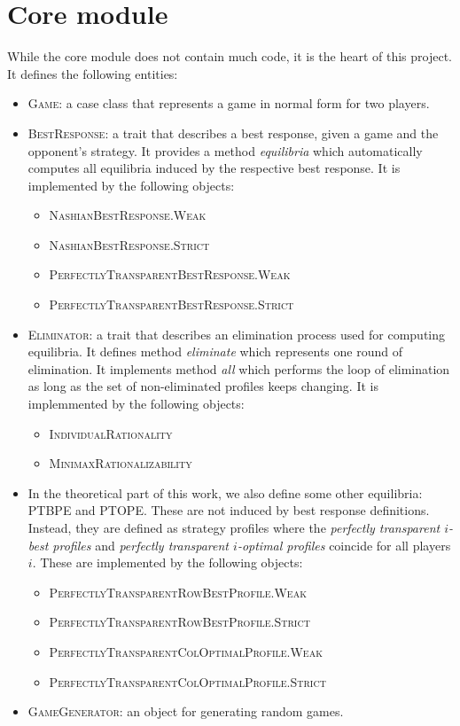 \section{Core module}
While the core module does not contain much code, it is the heart of this project.
It defines the following entities:
\begin{itemize}
	\item \textsc{Game}: a case class that represents a game in normal form for two players.
	\item \textsc{BestResponse}: a trait that describes a best response, given a game and the opponent's strategy.
	It provides a method \textit{equilibria} which automatically computes all equilibria induced by the respective best response.
	It is implemented by the following objects:
	\begin{itemize}
		\item \textsc{NashianBestResponse.Weak}
		\item \textsc{NashianBestResponse.Strict}
		\item \textsc{PerfectlyTransparentBestResponse.Weak}
		\item \textsc{PerfectlyTransparentBestResponse.Strict}
	\end{itemize}
	\item \textsc{Eliminator}: a trait that describes an elimination process used for computing equilibria.
	It defines method \textit{eliminate} which represents one round of elimination.
	It implements method \textit{all} which performs the loop of elimination as long as the set of non-eliminated profiles keeps changing.
	It is implemmented by the following objects:
	\begin{itemize}
		\item \textsc{IndividualRationality}
		\item \textsc{MinimaxRationalizability}
	\end{itemize}
	\item In the theoretical part of this work, we also define some other equilibria: PTBPE and PTOPE.
	These are not induced by best response definitions.
	Instead, they are defined as strategy profiles where the \textit{perfectly transparent $i$-best profiles} and \textit{perfectly transparent $i$-optimal profiles} coincide for all players $i$.
	These are implemented by the following objects:
	\begin{itemize}
		\item \textsc{PerfectlyTransparentRowBestProfile.Weak}
		\item \textsc{PerfectlyTransparentRowBestProfile.Strict}
		\item \textsc{PerfectlyTransparentColOptimalProfile.Weak}
		\item \textsc{PerfectlyTransparentColOptimalProfile.Strict}
	\end{itemize}
	\item \textsc{GameGenerator}: an object for generating random games.
\end{itemize}

